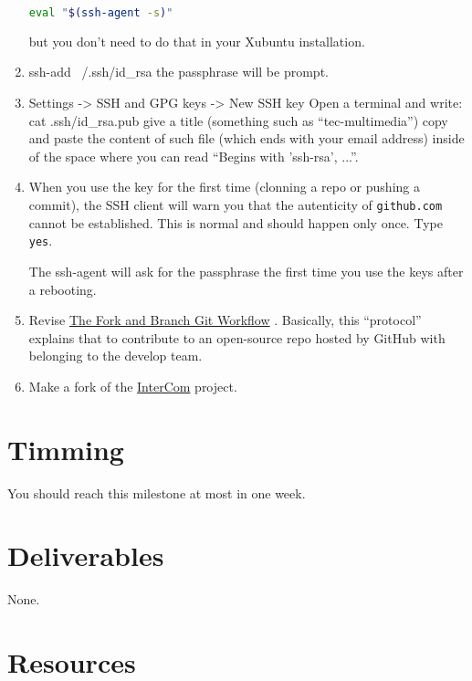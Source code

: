 \begin{enumerate}
  \begin{lstlisting}[language=bash]
    eval "$(ssh-agent -s)"
  \end{lstlisting}

  but you don't need to do that in your Xubuntu installation.

\item ssh-add ~/.ssh/id_rsa the passphrase will be prompt.
  
\item Settings -> SSH and GPG keys -> New SSH key
  Open a terminal and write:
  cat .ssh/id_rsa.pub
  give a title (something such as ``tec-multimedia'')
  copy and paste the content of such file (which ends with your email address) inside of the space where you can read ``Begins with 'ssh-rsa', ...''.

  \item When you use the key for the first time (clonning a repo or
    pushing a commit), the SSH client will warn you that the
    autenticity of \texttt{github.com} cannot be established. This is
    normal and should happen only once. Type \texttt{yes}.

The ssh-agent will ask for the passphrase the first time you use the keys after a rebooting.
  
\item Revise
  \href{https://github.com/vicente-gonzalez-ruiz/fork_and_branch_git_workflow}{The
    Fork and Branch Git Workflow} \cite{Git-workflow}. Basically, this
  ``protocol'' explains that to contribute to an open-source repo
  hosted by GitHub with belonging to the develop team.

\item Make a fork of the
  \href{https://github.com/Tecnologias-multimedia/intercom}{InterCom}
  project.
  
  
\end{enumerate}

\section{Timming}

You should reach this milestone at most in one week.

\section{Deliverables}

None.

\section{Resources}


